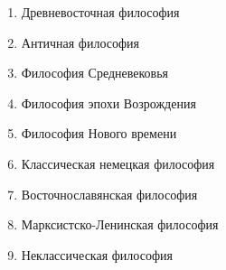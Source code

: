 \begin{enumerate}
\item Древневосточная философия
\item Античная философия
\item Философия Средневековья
\item Философия эпохи Возрождения
\item Философия Нового времени
\item Классическая немецкая философия
\item Восточнославянская философия
\item Марксистско-Ленинская философия
\item Неклассическая философия
\end{enumerate}
